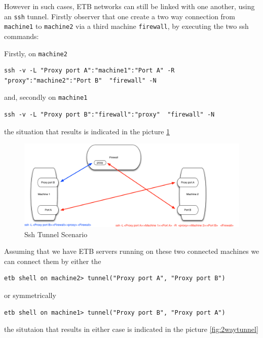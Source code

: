 \documentclass{article}
\begin{document}
However in such cases, ETB networks can still be linked with one another, using
an {\tt ssh} tunnel.  Firstly observer that one create a two way connection
from {\tt machine1} to {\tt machine2} via a third machine 
{\tt firewall}, by executing the two ssh commands:

Firstly, on  {\tt machine2} 

{\small
\begin{verbatim}
ssh -v -L "Proxy port A":"machine1":"Port A" -R "proxy":"machine2":"Port B"  "firewall" -N
\end{verbatim}
}

and, secondly on {\tt machine1}

{\small
\begin{verbatim}
ssh -v -L "Proxy port B":"firewall":"proxy"  "firewall" -N
\end{verbatim}
}

the situation that results is indicated in the picture \ref{fig:sshtunnel}

\begin{figure}
\begin{center}
\includegraphics[scale=.30]{images/sshTunnel}
\caption{Ssh Tunnel Scenario}\label{fig:sshtunnel}
\end{center}
\end{figure}

Assuming that we have ETB servers running on these two connected machines
we can connect them by either the 
\begin{verbatim}
etb shell on machine2> tunnel("Proxy port A", "Proxy port B")
\end{verbatim}
or symmetrically 
\begin{verbatim}
etb shell on machine1> tunnel("Proxy port B", "Proxy port A")
\end{verbatim}

the situtaion that results in either case is indicated in the picture \ref{fig:2waytunnel}
\end{document}
